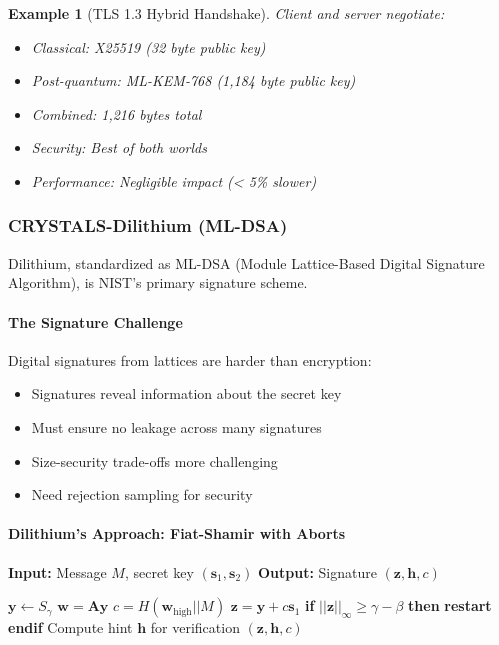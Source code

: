 \documentclass[11pt,a4paper]{article}
\newtheorem{example}{Example}
\begin{document}
\begin{example}[TLS 1.3 Hybrid Handshake]
Client and server negotiate:
\begin{itemize}
    \item Classical: X25519 (32 byte public key)
    \item Post-quantum: ML-KEM-768 (1,184 byte public key)
    \item Combined: 1,216 bytes total
    \item Security: Best of both worlds
    \item Performance: Negligible impact (< 5\% slower)
\end{itemize}
\end{example}

\subsubsection{CRYSTALS-Dilithium (ML-DSA)}

Dilithium, standardized as ML-DSA (Module Lattice-Based Digital Signature Algorithm), is NIST's primary signature scheme.

\paragraph{The Signature Challenge}

Digital signatures from lattices are harder than encryption:
\begin{itemize}
    \item Signatures reveal information about the secret key
    \item Must ensure no leakage across many signatures
    \item Size-security trade-offs more challenging
    \item Need rejection sampling for security
\end{itemize}

\paragraph{Dilithium's Approach: Fiat-Shamir with Aborts}

\begin{algorithm}
\caption{ML-DSA (Dilithium) Signing - Simplified}
\label{alg:dilithium}
\begin{algorithmic}[1]
\State \textbf{Input:} Message $M$, secret key $(\mathbf{s}_1, \mathbf{s}_2)$
\State \textbf{Output:} Signature $(\mathbf{z}, \mathbf{h}, c)$

\Repeat
    \State $\mathbf{y} \leftarrow S_\gamma$ 
    \State $\mathbf{w} = \mathbf{A}\mathbf{y}$ 
    \State $c = H(\mathbf{w}_{\text{high}} || M)$ 
    \State $\mathbf{z} = \mathbf{y} + c\mathbf{s}_1$ 
    \State \textbf{if} $||\mathbf{z}||_\infty \geq \gamma - \beta$ \textbf{then}
    \State \quad \textbf{restart} 
    \State \textbf{endif}
\State Compute hint $\mathbf{h}$ for verification
\State \Return $(\mathbf{z}, \mathbf{h}, c)$
\end{algorithmic}
\end{algorithm}
\end{document}
